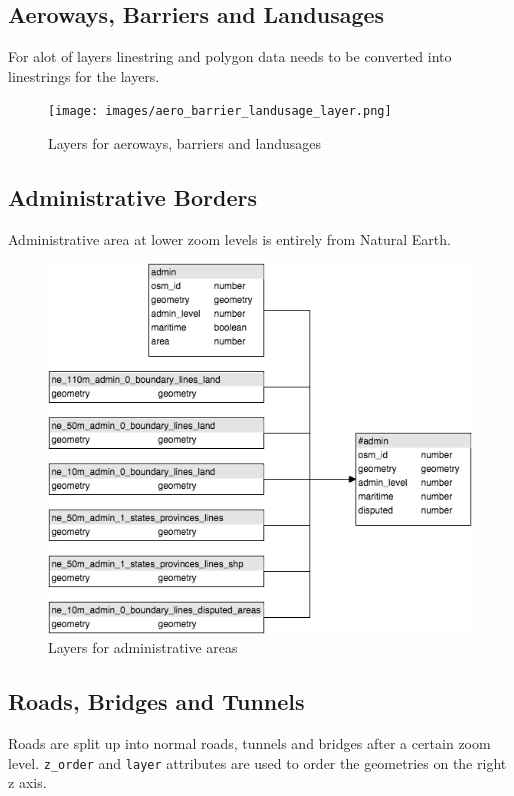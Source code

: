 \newpage
\subsection{Aeroways, Barriers and Landusages}

For alot of layers linestring and polygon data needs to be converted into
linestrings for the layers.

\begin{figure}[h]
  \centering
  \texttt{[image: images/aero\_barrier\_landusage\_layer.png]}
  \caption{Layers for aeroways, barriers and landusages}
\end{figure}

\newpage
\subsection{Administrative Borders}
Administrative area at lower zoom levels is entirely from Natural Earth.

\begin{figure}[h]
  \centering
  \includegraphics[scale=0.6]{images/admin_layer.png}
  \caption{Layers for administrative areas}
\end{figure}

\newpage
\subsection{Roads, Bridges and Tunnels}
Roads are split up into normal roads, tunnels and bridges after a certain zoom level. \texttt{z\_order} and \texttt{layer} attributes are used to order the geometries on the right z axis.

